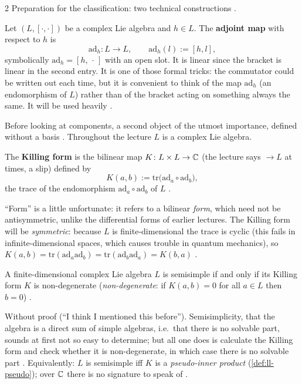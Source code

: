 \begin{paracol}{2}
Preparation for the classification: two technical constructions  .
\begin{definition}\label{def:cl-ad}
Let $(L,[\cdot,\cdot])$ be a complex Lie algebra and $h\in L$. The \textbf{adjoint map} with respect to $h$ is
\[
  \mathrm{ad}_h\colon L\to L,\qquad \mathrm{ad}_h(l):=[h,l],
\]
symbolically $\mathrm{ad}_h=[h,\,\cdot\,]$ with an open slot. It is linear since the bracket is linear in the second entry. It is one of those formal tricks: the commutator could be written out each time, but it is convenient to think of the map $\mathrm{ad}_h$ (an endomorphism of $L$) rather than of the bracket acting on something always the same. It will be used heavily      .
\end{definition}
Before looking at components, a second object of the utmost importance, defined without a basis . Throughout the lecture $L$ is a complex Lie algebra.
\begin{definition}\label{def:cl-killing}
The \textbf{Killing form} is the bilinear map $K\colon L\times L\to\mathbb{C}$ (the lecture says $\to L$ at times, a slip) defined by
\[
  K(a,b):=\mathrm{tr}\bigl(\mathrm{ad}_a\circ\mathrm{ad}_b\bigr),
\]
the trace of the endomorphism $\mathrm{ad}_a\circ\mathrm{ad}_b$ of $L$    .
\end{definition}
``Form'' is a little unfortunate: it refers to a bilinear \emph{form}, which need not be antisymmetric, unlike the differential forms of earlier lectures. The Killing form will be \emph{symmetric}: because $L$ is finite-dimensional the trace is cyclic (this fails in infinite-dimensional spaces, which causes trouble in quantum mechanics), so $K(a,b)=\mathrm{tr}(\mathrm{ad}_a\mathrm{ad}_b)=\mathrm{tr}(\mathrm{ad}_b\mathrm{ad}_a)=K(b,a)$    .
\begin{theorem}\label{thm:cl-cartan-criterion}
A finite-dimensional complex Lie algebra $L$ is semisimple if and only if its Killing form $K$ is non-degenerate (\emph{non-degenerate}: if $K(a,b)=0$ for all $a\in L$ then $b=0$)   .
\end{theorem}
Without proof (``I think I mentioned this before''). Semisimplicity, that the algebra is a direct sum of simple algebras, i.e.\ that there is no solvable part, sounds at first not so easy to determine; but all one does is calculate the Killing form and check whether it is non-degenerate, in which case there is no solvable part  . Equivalently: $L$ is semisimple iff $K$ is a \emph{pseudo-inner product} (\cref{def:ll-pseudo}); over $\mathbb{C}$ there is no signature to speak of   .


\end{paracol}
